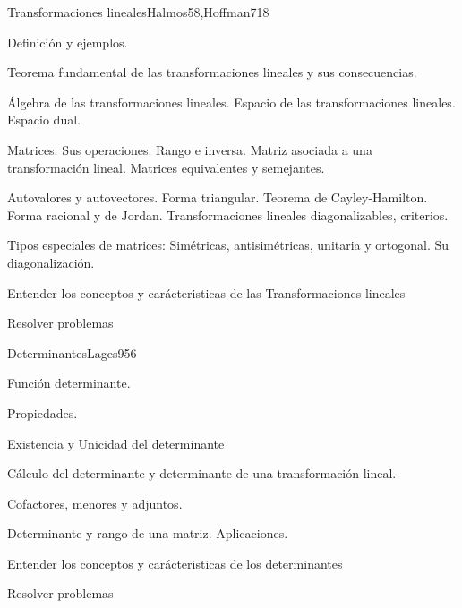 \begin{syllabus}
\begin{unit}{Transformaciones lineales}{Halmos58,Hoffman71}{8}
   \begin{topics}
         \item  Definición y ejemplos.
	 \item  Teorema fundamental de las transformaciones lineales y sus consecuencias.
         \item  Álgebra de las transformaciones lineales. Espacio de las transformaciones lineales. Espacio dual.
	 \item  Matrices. Sus operaciones. Rango e inversa. Matriz asociada a una transformación lineal. Matrices equivalentes y semejantes.
         \item  Autovalores y autovectores. Forma triangular. Teorema de Cayley-Hamilton. Forma racional y de  Jordan. Transformaciones lineales diagonalizables, criterios.
	 \item  Tipos especiales de matrices: Simétricas, antisimétricas, unitaria y ortogonal. Su diagonalización.
   \end{topics}

   \begin{learningoutcomes}
         \item  Entender los conceptos y carácteristicas de las Transformaciones lineales
         \item  Resolver problemas
   \end{learningoutcomes}
\end{unit}

\begin{unit}{Determinantes}{Lages95}{6}
   \begin{topics}
         \item  Función determinante.
	 \item  Propiedades.
         \item  Existencia y Unicidad del determinante
	 \item  Cálculo del determinante y determinante de una transformación lineal.
         \item  Cofactores, menores y adjuntos.
	\item Determinante y rango de una matriz. Aplicaciones.
   \end{topics}

   \begin{learningoutcomes}
         \item  Entender los conceptos y carácteristicas de los determinantes
         \item  Resolver problemas
   \end{learningoutcomes}
\end{unit}


\end{syllabus}

